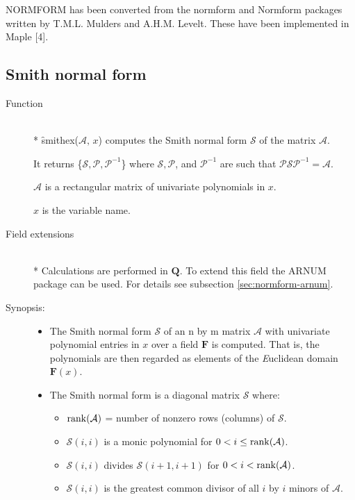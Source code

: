 {\small NORMFORM} has been converted from the normform and Normform
packages written by T.M.L. Mulders and A.H.M. Levelt. These have been
implemented in Maple [4].


\subsection{Smith normal form}

\begin{description}
\item[Function]\mbox{}\\*
\f{smithex}($\mathcal{A},\, x$) computes the Smith normal form $\mathcal{ S}$
of the matrix $\mathcal{ A}$.

It returns \{$\mathcal{ S}, \mathcal{ P}, \mathcal{ P}^{-1}$\} where $\mathcal{ S},
\mathcal{ P}$, and $\mathcal{ P}^{-1}$ are such that $\mathcal{ P S P}^{-1} =
\mathcal{ A}$.

$\mathcal{ A}$ is a rectangular matrix of univariate polynomials in $x$.

$x$ is the variable name.

\item[Field extensions]\mbox{}\\*
Calculations are performed in $\mathbf{Q}$. To extend this field the
{\small ARNUM} package can be used. For details see subsection \ref{sec:normform-arnum}.

\item[Synopsis:]
\begin{itemize}
\item The Smith normal form $\mathcal{S}$ of an n by m matrix $\mathcal{A}$
with univariate polynomial entries in $x$ over a field $\mathbf{F}$ is
computed. That is, the polynomials are then regarded as elements of the
{\it E}uclidean domain $\mathbf{F}(x)$.

\item The Smith normal form is a diagonal matrix $\mathcal{S}$ where:

  \begin{itemize}
  \item $\mathop{\mathrm{rank}}(\mathcal{A})$ = number of nonzero rows (columns) of
        $\mathcal{S}$.
  \item $\mathcal{S}(i,i)$ is a monic polynomial for $0 < i \leq \mathop{\mathrm{rank}}(\mathcal{A})$.
  \item $\mathcal{S}(i,i)$ divides $\mathcal{S}(i+1,i+1)$ for $0 < i < \mathop{\mathrm{rank}}(\mathcal{A})$.
  \item $\mathcal{ S}(i,i)$ is the greatest common divisor of all $i$ by
        $i$ minors of $\mathcal{A}$.
  \end{itemize}


\end{itemize}
\end{description}
